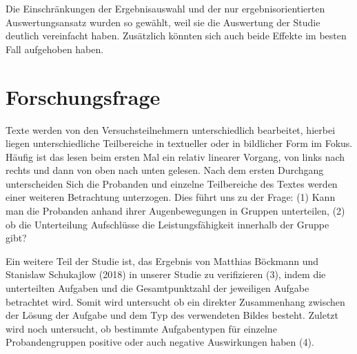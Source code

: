 Die Einschränkungen der Ergebnisauswahl und der nur ergebnisorientierten Auswertungsansatz wurden so gewählt, weil sie die Auswertung der Studie deutlich vereinfacht haben.  Zusätzlich könnten sich auch beide Effekte im besten Fall aufgehoben haben.  

\section{Forschungsfrage}

Texte werden von den Versuchsteilnehmern unterschiedlich bearbeitet, hierbei liegen unterschiedliche Teilbereiche in textueller oder in bildlicher Form im Fokus. Häufig ist das lesen beim ersten Mal ein relativ linearer Vorgang, von links nach rechts und dann von oben nach unten gelesen. Nach dem ersten Durchgang unterscheiden Sich die Probanden und einzelne Teilbereiche des Textes werden einer weiteren Betrachtung unterzogen. Dies führt uns zu der Frage:
(1) Kann man die Probanden anhand ihrer Augenbewegungen in Gruppen unterteilen, (2) ob die Unterteilung Aufschlüsse die Leistungsfähigkeit innerhalb der Gruppe gibt?

Ein weitere Teil der Studie ist, das Ergebnis von Matthias Böckmann und Stanislaw Schukajlow (2018) in unserer Studie zu verifizieren (3), indem die unterteilten Aufgaben und die Gesamtpunktzahl der jeweiligen Aufgabe betrachtet wird. Somit wird untersucht ob ein direkter Zusammenhang zwischen der Lösung der Aufgabe und dem Typ des verwendeten Bildes besteht. Zuletzt wird noch untersucht, ob bestimmte Aufgabentypen für einzelne Probandengruppen positive oder auch negative Auswirkungen haben (4).